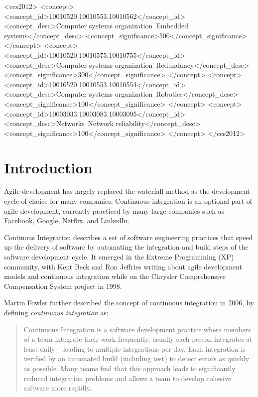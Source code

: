 \documentclass{sig-alternate}
\begin{document}
\begin{CCSXML}
<ccs2012>
 <concept>
  <concept_id>10010520.10010553.10010562</concept_id>
  <concept_desc>Computer systems organization~Embedded systems</concept_desc>
  <concept_significance>500</concept_significance>
 </concept>
 <concept>
  <concept_id>10010520.10010575.10010755</concept_id>
  <concept_desc>Computer systems organization~Redundancy</concept_desc>
  <concept_significance>300</concept_significance>
 </concept>
 <concept>
  <concept_id>10010520.10010553.10010554</concept_id>
  <concept_desc>Computer systems organization~Robotics</concept_desc>
  <concept_significance>100</concept_significance>
 </concept>
 <concept>
  <concept_id>10003033.10003083.10003095</concept_id>
  <concept_desc>Networks~Network reliability</concept_desc>
  <concept_significance>100</concept_significance>
 </concept>
</ccs2012>  
\end{CCSXML}



\section{Introduction}
Agile development has largely replaced the waterfall method as the development cycle of choice for many companies. Continuous integration is an optional part of agile development, currently practiced by many large companies such as Facebook, Google, Netflix, and LinkedIn.

Continous Integration describes a set of software engineering practices that speed up the delivery of software by automating the integration and build steps of the software development cycle. It emerged in the Extreme Programming (XP) community, with Kent Beck and Ron Jeffries writing about agile development models and continuous integration while on the Chrysler Comprehensive Compensation System project in 1998\cite{beck:extreme_programming}\cite{beck:agile_manifesto}.


Martin Fowler further described the concept of continuous integration in 2006, by defining \textit{continuous integration} as:
\begin{quote}
Continuous Integration is a software development practice where members of a team integrate their work frequently, usually each person integrates at least daily -- leading to multiple integrations per day. Each integration is verified by an automated build (including test) to detect errors as quickly as possible. Many teams find that this approach leads to significantly reduced integration problems and allows a team to develop cohesive software more rapidly.\cite{fowler:continuous}
\end{quote}
\end{document}
